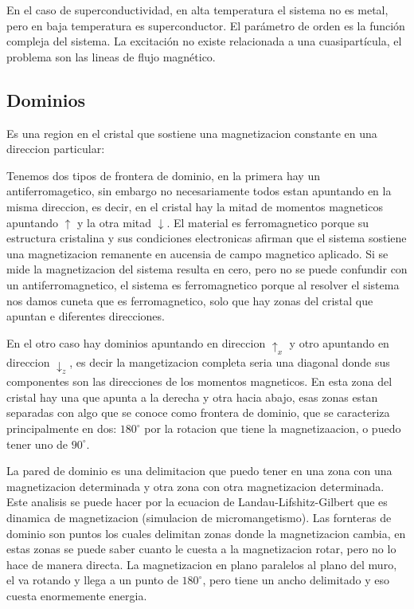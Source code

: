 \documentclass[11pt,fleqn]{book}
\begin{document}
En el caso de superconductividad, en alta temperatura el sistema no es metal, pero en baja temperatura es superconductor. El parámetro de orden es la función compleja del sistema. La excitación no existe relacionada a una cuasipartícula, el problema son las lineas de flujo magnético.

\subsection{Dominios}

Es una region en el cristal que sostiene una magnetizacion constante en una direccion particular:


Tenemos dos tipos de frontera de dominio, en la primera hay un antiferromagetico, sin embargo no necesariamente todos estan apuntando en la misma direccion, es decir, en el cristal hay la mitad de momentos magneticos apuntando $\uparrow$ y la otra mitad $\downarrow$. El material es ferromagnetico porque su estructura cristalina y sus condiciones electronicas afirman que el sistema sostiene una magnetizacion remanente en aucensia de campo magnetico aplicado. Si se mide la magnetizacion del sistema resulta en cero, pero no se puede confundir con un antiferromagnetico, el sistema es ferromagnetico porque al resolver el sistema nos damos cuneta que es ferromagnetico, solo que hay  zonas del cristal que apuntan e diferentes direcciones.

En el otro caso hay dominios apuntando en direccion $\uparrow_{x}$ y otro apuntando en direccion $\downarrow_{z}$, es decir la mangetizacion completa seria una diagonal donde sus componentes son las direcciones de los momentos magneticos. En esta zona del cristal hay una que apunta a la derecha y otra hacia abajo, esas zonas estan separadas con algo que se conoce como frontera de dominio, que se caracteriza principalmente en dos: $180^{\circ}$ por la rotacion que tiene la magnetizaacion, o puedo tener uno de $90^{\circ}$. 

La pared de dominio es una delimitacion que puedo tener en una zona con una magnetizacion determinada y otra zona con otra magnetizacion determinada. Este analisis se puede hacer por la ecuacion de Landau-Lifshitz-Gilbert que es dinamica de magnetizacion (simulacion de micromangetismo). Las fornteras de dominio son puntos los cuales delimitan zonas donde la magnetizacion cambia, en estas zonas se puede saber cuanto le cuesta a la magnetizacion rotar, pero no lo hace de manera directa. La magnetizacion en plano paralelos al plano del muro, el va rotando y llega a un punto de $180^{\circ}$, pero tiene un ancho delimitado y eso cuesta enormemente energia.
\end{document}
